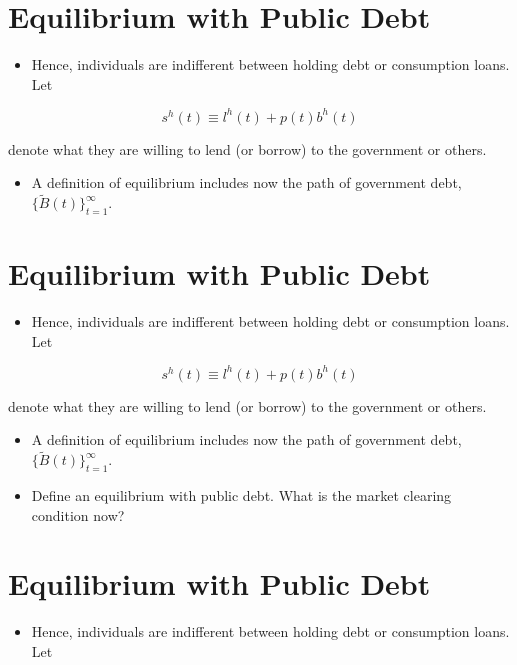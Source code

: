 \documentclass[10pt]{article}
\begin{document}
\section*{Equilibrium with Public Debt}
\begin{itemize}
  \item Hence, individuals are indifferent between holding debt or consumption loans. Let
\end{itemize}

$$
s^{h}(t) \equiv l^{h}(t)+p(t) b^{h}(t)
$$

denote what they are willing to lend (or borrow) to the government or others.

\begin{itemize}
  \item A definition of equilibrium includes now the path of government debt, $\{\widetilde{B}(t)\}_{t=1}^{\infty}$.
\end{itemize}

\section*{Equilibrium with Public Debt}
\begin{itemize}
  \item Hence, individuals are indifferent between holding debt or consumption loans. Let
\end{itemize}

$$
s^{h}(t) \equiv l^{h}(t)+p(t) b^{h}(t)
$$

denote what they are willing to lend (or borrow) to the government or others.

\begin{itemize}
  \item A definition of equilibrium includes now the path of government debt, $\{\widetilde{B}(t)\}_{t=1}^{\infty}$.
  \item Define an equilibrium with public debt. What is the market clearing condition now?
\end{itemize}

\section*{Equilibrium with Public Debt}
\begin{itemize}
  \item Hence, individuals are indifferent between holding debt or consumption loans. Let
\end{itemize}
\end{document}
